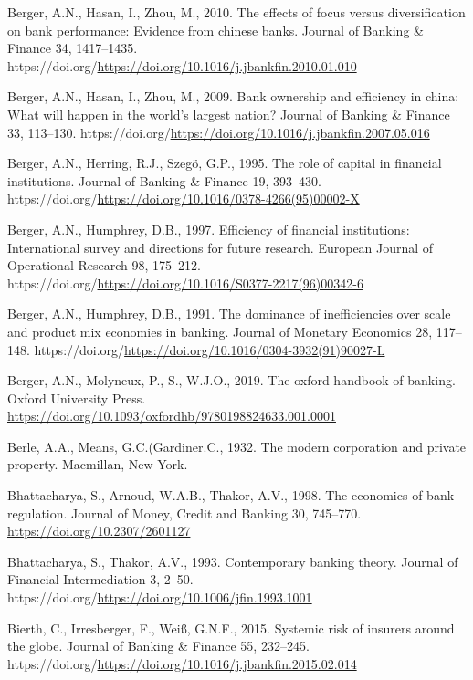 \documentclass[
  letterpaper,
  DIV=11,
  numbers=noendperiod]{scrreprt}
\newlength{\cslhangindent}
\newenvironment{CSLReferences}[2] %
 {\begin{list}{}{%
  \setlength{\itemindent}{0pt}
  \setlength{\leftmargin}{0pt}
  \setlength{\parsep}{0pt}
  \ifodd #1
   \setlength{\leftmargin}{\cslhangindent}
   \setlength{\itemindent}{-1\cslhangindent}
  \fi
  \setlength{\itemsep}{#2\baselineskip}}}
 {\end{list}}
\begin{document}
\begin{CSLReferences}{1}{0}
Berger, A.N., Hasan, I., Zhou, M., 2010. The effects of focus versus
diversification on bank performance: Evidence from chinese banks.
Journal of Banking \& Finance 34, 1417--1435.
https://doi.org/\url{https://doi.org/10.1016/j.jbankfin.2010.01.010}

Berger, A.N., Hasan, I., Zhou, M., 2009. Bank ownership and efficiency
in china: What will happen in the world's largest nation? Journal of
Banking \& Finance 33, 113--130.
https://doi.org/\url{https://doi.org/10.1016/j.jbankfin.2007.05.016}

Berger, A.N., Herring, R.J., Szegö, G.P., 1995. The role of capital in
financial institutions. Journal of Banking \& Finance 19, 393--430.
https://doi.org/\url{https://doi.org/10.1016/0378-4266(95)00002-X}

Berger, A.N., Humphrey, D.B., 1997. Efficiency of financial
institutions: International survey and directions for future research.
European Journal of Operational Research 98, 175--212.
https://doi.org/\url{https://doi.org/10.1016/S0377-2217(96)00342-6}

Berger, A.N., Humphrey, D.B., 1991. The dominance of inefficiencies over
scale and product mix economies in banking. Journal of Monetary
Economics 28, 117--148.
https://doi.org/\url{https://doi.org/10.1016/0304-3932(91)90027-L}

Berger, A.N., Molyneux, P., S., W.J.O., 2019. The oxford handbook of
banking. Oxford University Press.
\url{https://doi.org/10.1093/oxfordhb/9780198824633.001.0001}

Berle, A.A., Means, G.C.(Gardiner.C., 1932. The modern corporation and
private property. Macmillan, New York.

Bhattacharya, S., Arnoud, W.A.B., Thakor, A.V., 1998. The economics of
bank regulation. Journal of Money, Credit and Banking 30, 745--770.
\url{https://doi.org/10.2307/2601127}

Bhattacharya, S., Thakor, A.V., 1993. Contemporary banking theory.
Journal of Financial Intermediation 3, 2--50.
https://doi.org/\url{https://doi.org/10.1006/jfin.1993.1001}

Bierth, C., Irresberger, F., Weiß, G.N.F., 2015. Systemic risk of
insurers around the globe. Journal of Banking \& Finance 55, 232--245.
https://doi.org/\url{https://doi.org/10.1016/j.jbankfin.2015.02.014}


\end{CSLReferences}
\end{document}
